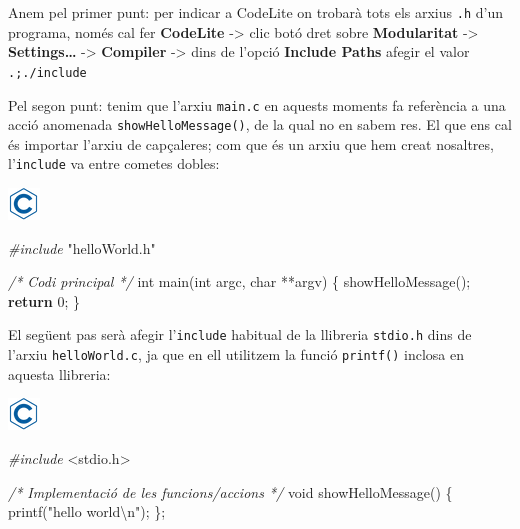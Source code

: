 \documentclass[
]{book}
\newenvironment{Shaded}{\begin{snugshade}}{\end{snugshade}}
\newcommand{\CommentTok}[1]{\textcolor[rgb]{0.56,0.35,0.01}{\textit{#1}}}
\newcommand{\ControlFlowTok}[1]{\textcolor[rgb]{0.13,0.29,0.53}{\textbf{#1}}}
\newcommand{\DataTypeTok}[1]{\textcolor[rgb]{0.13,0.29,0.53}{#1}}
\newcommand{\DecValTok}[1]{\textcolor[rgb]{0.00,0.00,0.81}{#1}}
\newcommand{\ImportTok}[1]{#1}
\newcommand{\NormalTok}[1]{#1}
\newcommand{\PreprocessorTok}[1]{\textcolor[rgb]{0.56,0.35,0.01}{\textit{#1}}}
\newcommand{\SpecialCharTok}[1]{\textcolor[rgb]{0.00,0.00,0.00}{#1}}
\newcommand{\StringTok}[1]{\textcolor[rgb]{0.31,0.60,0.02}{#1}}
\begin{document}
Anem pel primer punt: per indicar a CodeLite on trobarà tots els arxius \texttt{.h} d'un programa, només cal fer \textbf{CodeLite} -\textgreater{} clic botó dret sobre \textbf{Modularitat} -\textgreater{} \textbf{Settings\ldots{}} -\textgreater{} \textbf{Compiler} -\textgreater{} dins de l'opció \textbf{Include Paths} afegir el valor \texttt{.;./include}

Pel segon punt: tenim que l'arxiu \texttt{main.c} en aquests moments fa referència a una acció anomenada \texttt{showHelloMessage()}, de la qual no en sabem res. El que ens cal és importar l'arxiu de capçaleres; com que és un arxiu que hem creat nosaltres, l'\texttt{include} va entre cometes dobles:

\includegraphics{./img/c.png}

\begin{Shaded}
\begin{Highlighting}[]
\PreprocessorTok{\#include }\ImportTok{"helloWorld.h"}

\CommentTok{/* Codi principal */}
\DataTypeTok{int}\NormalTok{ main(}\DataTypeTok{int}\NormalTok{ argc, }\DataTypeTok{char}\NormalTok{ **argv) \{}
\NormalTok{    showHelloMessage();}
    \ControlFlowTok{return} \DecValTok{0}\NormalTok{;}
\NormalTok{\}}
\end{Highlighting}
\end{Shaded}

El següent pas serà afegir l'\texttt{include} habitual de la llibreria \texttt{stdio.h} dins de l'arxiu \texttt{helloWorld.c}, ja que en ell utilitzem la funció \texttt{printf()} inclosa en aquesta llibreria:

\includegraphics{./img/c.png}

\begin{Shaded}
\begin{Highlighting}[]
\PreprocessorTok{\#include }\ImportTok{\textless{}stdio.h\textgreater{}}

\CommentTok{/* Implementació de les funcions/accions */}
\DataTypeTok{void}\NormalTok{ showHelloMessage() \{}
\NormalTok{    printf(}\StringTok{"hello world}\SpecialCharTok{\textbackslash{}n}\StringTok{"}\NormalTok{);}
\NormalTok{\};}
\end{Highlighting}
\end{Shaded}
\end{document}

